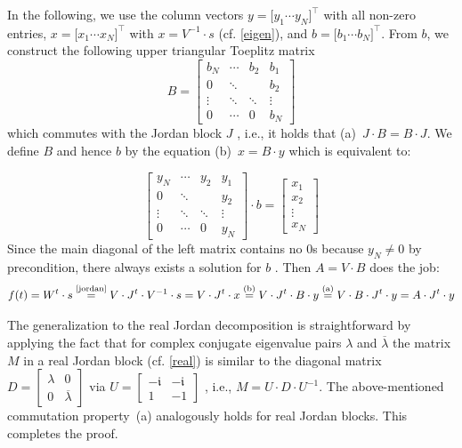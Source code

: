 \documentclass[a4paper,10pt,headings=small]{scrartcl}
\theoremstyle{definition}
\begin{document}
In the following, we use the column vectors $y = \big[ y_1 \cdots y_N
\big]^\top$ with all non-zero entries, $x = \big[ x_1 \cdots x_N \big]^\top$
with $x = V^{-1} \cdot s$ (cf. \cref{eigen}), and $b = \big[ b_1 \cdots b_N
\big]^\top$. From $b$, we construct the following upper triangular Toeplitz
matrix
\[ B = \left[ \begin{array}{*{4}{c}}
  b_N & \cdots & b_2 & b_1\\
  0 & \ddots & & b_2\\
  \vdots & \ddots & \ddots & \vdots\\
  0 & \cdots & 0 & b_N
\end{array} \right] \]
which commutes with the Jordan block $J$ \cite[Sect.~3.2.4]{HJ13}, i.e., it
holds that (a)~$J \cdot B = B \cdot J$. We define $B$ and hence $b$ by the
equation (b)~$x = B \cdot y$ which is equivalent to:

\[ \left[ \begin{array}{*{4}{c}}
  y_N & \cdots & y_2 & y_1\\
  0 & \ddots & & y_2\\
  \vdots & \ddots & \ddots & \vdots\\
  0 & \cdots & 0 & y_N
\end{array} \right] \cdot b = \left[ \begin{array}{c}
  x_1\\[7pt] x_2\\ \vdots\\ x_N
\end{array} \right] \]
Since the main diagonal of the left matrix contains no $0$s because $y_N \neq 0$
by precondition, there always exists a solution for $b$ \cite[Sect.~0.9.3]{HJ13}.
Then $A = V \cdot B$ does the job:
\[ f(t) = W^t \cdot s
	\overset{\text{\cref{jordan}}}{=} V \cdot J^t \cdot V^{-1} \cdot s
	= V \cdot J^t \cdot x
	\overset{\text{(b)}}{=} V \cdot J^t \cdot B \cdot y
	\overset{\text{(a)}}{=} V \cdot B \cdot J^t \cdot y
	= A \cdot J^t \cdot y
\]

The generalization to the real Jordan decomposition is straightforward by
applying the fact that for complex conjugate eigenvalue pairs $\lambda$ and
$\overline{\lambda}$ the matrix $M$ in a real Jordan block (cf. \cref{real}) is
similar to the diagonal matrix $D = \left[ \begin{array}{cc}
	\lambda & 0\\
	0 & \overline{\lambda}
\end{array} \right]$ via $U = \left[ \begin{array}{cc}
	-\mathfrak{i} & -\mathfrak{i}\\
	1 & -1
\end{array} \right]$ \citep[Sect.~3.4.1]{HJ13}, i.e., $M = U \cdot D \cdot
U^{-1}$. The above-mentioned commutation property~(a) analogously holds for real
Jordan blocks. This completes the proof.
\end{document}
